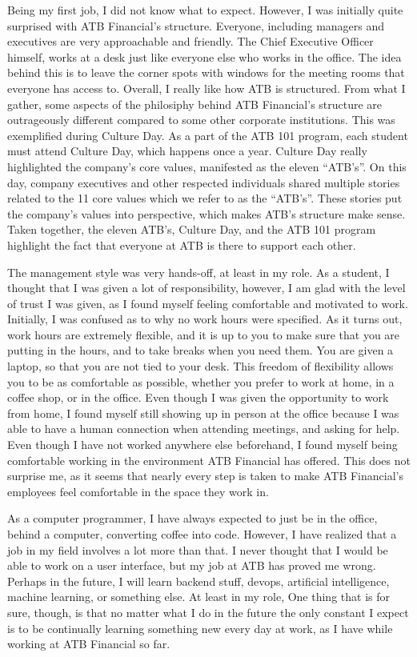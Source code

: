 \documentclass[letterpaper,12pt]{article}
\begin{document}
Being my first job, I did not know what to expect.
However, I was initially quite surprised with ATB Financial's structure. Everyone, including managers
and executives are very approachable and friendly. The Chief Executive Officer himself, works at
a desk just like everyone else who works in the office. The idea behind this is to leave the
corner spots with windows for the meeting rooms that everyone has access to.
Overall, I really like how ATB is structured. From what I gather, some aspects of the philosiphy
behind ATB Financial's structure are outrageously different compared to some other corporate institutions.
This was exemplified during Culture Day.
As a part of the ATB 101 program, each student
must attend Culture Day, which happens once a year. Culture Day really highlighted the company's
core values, manifested as the eleven ``ATB's''\cite{11atb}. On this day, company executives and
other respected individuals shared multiple stories related to the 11 core values which we refer to
as the ``ATB's''. These stories put the company's values into perspective, which makes ATB's structure
make sense. Taken together, the eleven ATB's, Culture Day, and the ATB 101 program
highlight the fact that everyone at ATB is there to support each other.


The management style was very hands-off, at least in my role. As a student,
I thought that I was given a lot of responsibility, however, I am glad
with the level of trust I was given, as I found myself feeling
comfortable and motivated to work.
Initially, I was confused as to why no work hours were specified. As it turns out,
work hours are extremely flexible, and it is up to you to make sure that you are
putting in the hours, and to take breaks when you need them. You are given a laptop, so
that you are not tied to your desk. This freedom of flexibility allows you to be
as comfortable as possible, whether you prefer to work at home, in a coffee shop,
or in the office. Even though I was given the opportunity to work from home,
I found myself still showing up in person at the office
because I was able to have a human connection when attending meetings,
and asking for help. Even though I have not worked
anywhere else beforehand, I found myself being comfortable working in the
environment ATB Financial has offered. This does not surprise me, as it seems
that nearly every step is taken to make ATB Financial's employees feel
comfortable in the space they work in.


As a computer programmer, I have always expected to just be in the office, behind a computer,
converting coffee into code. However, I have realized that a job in my field
involves a lot more than that. I never thought that I would be able to work
on a user interface, but my job at ATB has proved me wrong.
Perhaps in the future, I will learn backend stuff, devops, artificial intelligence,
machine learning, or something else. At least in my role, One thing that is for sure, though, is that
no matter what I do in the future the only constant I expect is to be
continually learning something new every day at work, as I have while working
at ATB Financial so far.
\end{document}
